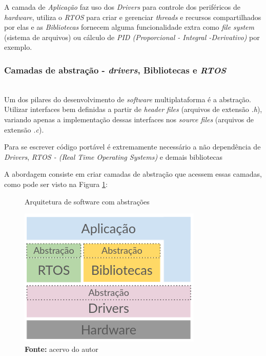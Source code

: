 \documentclass[times, twoside, watermark]{artigo}
\begin{document}
A camada de \textit{Aplicação} faz uso dos \textit{Drivers} para controle dos
periféricos de \textit{hardware}, utiliza o \textit{RTOS} para criar e gerenciar
\textit{threads} e recursos compartilhados por elas e as \textit{Bibliotecas}
fornecem alguma funcionalidade extra como \textit{file system} (sistema de arquivos)
ou cálculo de \textit{PID (Proporcional - Integral -Derivativo)} por exemplo.

\subsubsection{Camadas de abstração - \textit{drivers}, Bibliotecas e \textit{RTOS}}\hfill\\

Um dos pilares do desenvolvimento de \textit{software} multiplataforma é a abstração.
Utilizar interfaces bem definidas a partir de \textit{header files} (arquivos de
extensão \textit{.h}), variando apenas a implementação dessas interfaces nos
\textit{source files} (arquivos de extensão \textit{.c}).

Para se escrever código portável é extremamente necessário a não dependência de
\textit{Drivers}, \textit{RTOS - (Real Time Operating Systems)} e demais bibliotecas

A abordagem consiste em criar camadas de abstração que acessem essas camadas, como
pode ser visto na Figura \ref{fig:arch-abs}: \hfill\\

\begin{figure}[H]
  \centering
  \caption{Arquitetura de software com abstrações}
  \includegraphics[width=0.9\linewidth]{images/arch-abs.png}
  \caption*{\newline\textbf{Fonte:} acervo do autor}
  \label{fig:arch-abs}
\end{figure}
\end{document}
